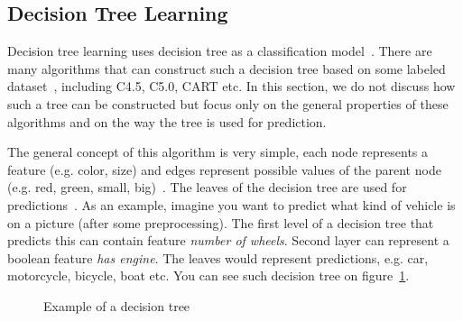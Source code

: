 \subsection{Decision Tree Learning}

Decision tree learning uses decision tree as a classification model~\cite{mitchell1997machine}. There are many algorithms that can construct such a decision tree based on some labeled dataset~\cite{mitchell1997machine}, including C4.5, C5.0, CART etc. In this section, we do not discuss how such a tree can be constructed but focus only on the general properties of these algorithms and on the way the tree is used for prediction.

The general concept of this algorithm is very simple, each node represents a feature (e.g. color, size) and edges represent possible values of the parent node (e.g. red, green, small, big)~\cite{mitchell1997machine}. The leaves of the decision tree are used for predictions~\cite{mitchell1997machine}. As an example, imagine you want to predict what kind of vehicle is on a picture (after some preprocessing). The first level of a decision tree that predicts this can contain feature \textit{number of wheels}. Second layer can represent a boolean feature \textit{has engine}. The leaves would represent predictions, e.g. car, motorcycle, bicycle, boat etc. You can see such decision tree on figure~\ref{fig:decision.tree.example}.

\begin{figure}[htbp]
    \centering
    \caption{Example of a decision tree}
    \label{fig:decision.tree.example}
\end{figure}

